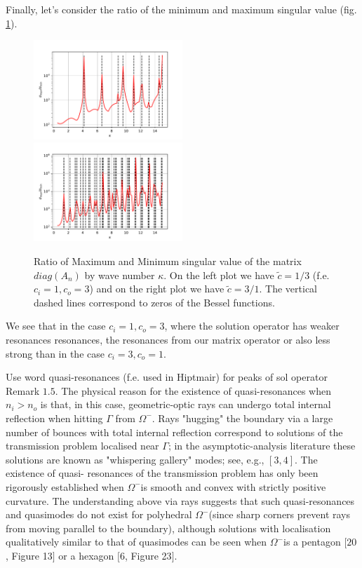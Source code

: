 \documentclass[10pt,journal,compsoc, onecolumn]{IEEEtran}
\begin{document}
Finally, let's consider the ratio of the minimum and maximum singular value (fig. \ref{fig:ratio_sing_val}).
\begin{figure}
    \includegraphics[width=0.5\textwidth]{scenario1Ratio.pdf}
    \includegraphics[width=0.5\textwidth]{scenario2Ratio.pdf}
    \caption{Ratio of Maximum and Minimum singular value of the matrix $diag(A_n)$ by wave number $\kappa$. 
     On the left plot we have $\tilde c = 1/3$ (f.e.$c_i = 1, c_o = 3$)
    and on the right plot we have $\tilde c = 3/1$.  The vertical dashed lines correspond to zeros of the Bessel functions. }
   \label{fig:ratio_sing_val}
\end{figure}
We see that in the case $c_i = 1, c_o =3$, where the solution operator has weaker resonances resonances, 
the resonances from our matrix operator or also less strong 
than in the case $c_i = 3, c_o =1$. \cite{hiptmair2021spurious}

Use word quasi-resonances (f.e. used in Hiptmair) for peaks of sol operator 
Remark \(1.5 .\) The physical reason for the existence of quasi-resonances when \(n_{i}>n_{o}\) is that, in
this case, geometric-optic rays can undergo total internal reflection when hitting \(\Gamma\) from \(\Omega^{-}\). Rays
"hugging" the boundary via a large number of bounces with total internal reflection correspond
to solutions of the transmission problem localised near \(\Gamma\); in the asymptotic-analysis literature
these solutions are known as "whispering gallery" modes; see, e.g., \([3,4]\). The existence of quasi-
resonances of the transmission problem has only been rigorously established when \(\Omega^{-}\)is smooth
and convex with strictly positive curvature. The understanding above via rays suggests that such
quasi-resonances and quasimodes do not exist for polyhedral \(\Omega^{-}\)(since sharp corners prevent rays
from moving parallel to the boundary), although solutions with localisation qualitatively similar to
that of quasimodes can be seen when \(\Omega^{-}\)is a pentagon \([20\), Figure 13\(]\) or a hexagon \([6\), Figure 23\(] .\)
\end{document}

